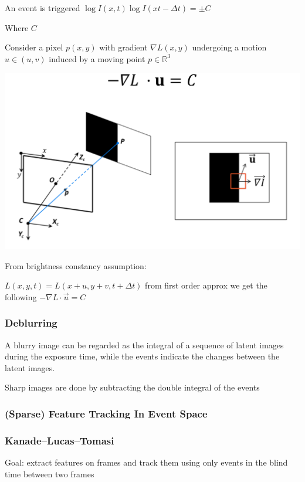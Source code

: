 An event is triggered $\log I(x,t) \log I(xt-\Delta t)=\pm C$

Where $C$ 

Consider a pixel $p(x,y)$ with gradient $\nabla L(x,y)$ undergoing a motion $u\in(u,v)$ induced by a moving point $p \in\mathbb{R}^3 $

\includegraphics{event_cameras_fig/event_cameras.png}

From brightness constancy assumption:

$L(x,y,t) = L(x+u,y+v,t+\Delta t)$ from first order approx we get the following $-\nabla L \cdot \vec u = C$

\subsubsection{Deblurring}

A blurry image can be regarded as the integral of a sequence of latent images during the exposure time, while the events indicate the changes between the latent images.

Sharp images are done by subtracting the double integral of the events

\subsubsection{(Sparse) Feature Tracking In Event Space}

\subsubsection{Kanade–Lucas–Tomasi}

Goal: extract features on frames and track them using only events in the blind time between two frames

